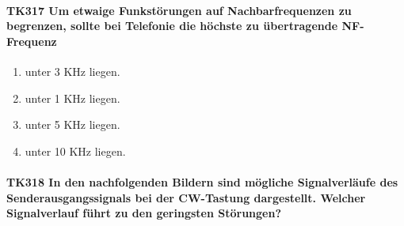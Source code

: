 \documentclass[8pt]{article}
\begin{document}
\paragraph*{TK317 Um etwaige Funkstörungen auf Nachbarfrequenzen zu begrenzen, sollte bei Telefonie die höchste zu übertragende NF-Frequenz}
\begin{enumerate}[nolistsep,label=\Alph*]
\item unter 3 KHz liegen.
\item unter 1 KHz liegen.
\item unter 5 KHz liegen.
\item unter 10 KHz liegen.
\end{enumerate}

\paragraph*{TK318 In den nachfolgenden Bildern sind mögliche Signalverläufe des Senderausgangssignals bei der CW-Tastung dargestellt. Welcher Signalverlauf führt zu den geringsten Störungen?}
\end{document}
